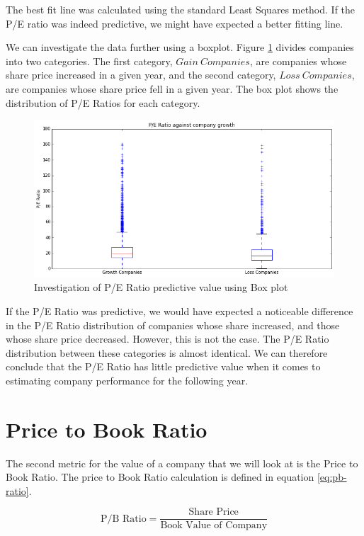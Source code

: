 \documentclass{report}
\begin{document}
The best fit line was calculated using the standard Least Squares method. If the P/E ratio was indeed predictive, we might have expected a better fitting line.

We can investigate the data further using a boxplot. Figure \ref{fig:pe-box} divides companies into two categories. The first category, $Gain\ Companies$, are companies whose share price increased in a given year, and the second category, $Loss\ Companies$, are companies whose share price fell in a given year. The box plot shows the distribution of P/E Ratios for each category.

\begin{figure}[H]
	\caption{Investigation of P/E Ratio predictive value using Box plot}
	\centerline{\includegraphics[width=\textwidth]{vis/pe_box.png}}
	\label{fig:pe-box}
\end{figure}

If the P/E Ratio was predictive, we would have expected a noticeable difference in the P/E Ratio distribution of companies whose share increased, and those whose share price decreased. However, this is not the case. The P/E Ratio distribution between these categories is almost identical. We can therefore conclude that the P/E Ratio has little predictive value when it comes to estimating company performance for the following year.

\section{Price to Book Ratio}

The second metric for the value of a company that we will look at is the Price to Book Ratio. The price to Book Ratio calculation is defined in equation \ref{eq:pb-ratio}.

\begin{center}
\begin{equation}
  \text{P/B Ratio} = \dfrac{\text{Share Price}}{\text{Book Value of Company}}
\end{equation}
\label{eq:pb-ratio}  
\end{center}
\end{document}
